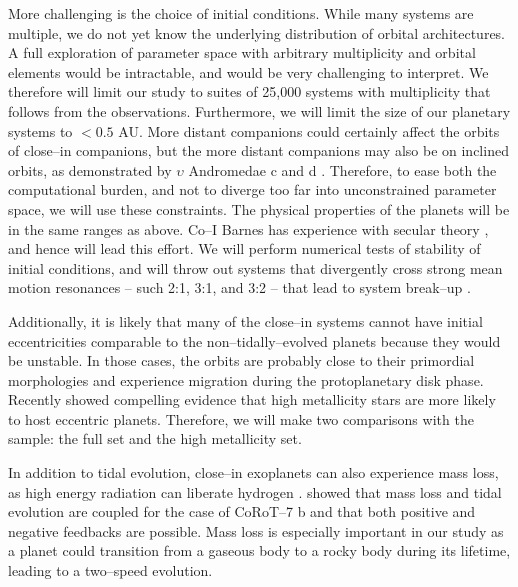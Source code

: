 More challenging is the choice of initial conditions.  While many
\kepler systems are multiple, we do not yet know the underlying
distribution of orbital architectures.  A full exploration of
parameter space with arbitrary multiplicity and orbital elements would
be intractable, and would be very challenging to interpret.  We
therefore will limit our study to suites of 25,000 systems with
multiplicity that follows from the observations.  Furthermore, we will
limit the size of our planetary systems to $<0.5$ AU.  More distant
companions could certainly affect the orbits of close--in companions,
but the more distant companions may also be on inclined orbits, as
demonstrated by $\upsilon$ Andromedae c and d
\citep{McArthur10,ReffertQuirrenbach11}.  Therefore, to ease both the
computational burden, and not to diverge too far into unconstrained
parameter space, we will use these constraints.  The physical
properties of the planets will be in the same ranges as above.  Co--I
Barnes has experience with secular theory
\citep{BarnesGreenberg06a,BarnesGreenberg06b}, and hence will lead
this effort.  We will perform numerical tests of stability of initial
conditions, and will throw out systems that divergently cross strong
mean motion resonances -- such 2:1, 3:1, and 3:2 -- that lead to
system break--up \citep[e.g.][]{Gomes05}.

Additionally, it is likely that many of the close--in systems cannot
have initial eccentricities comparable to the non--tidally--evolved
planets because they would be unstable.  In those cases, the orbits
are probably close to their primordial morphologies and experience
migration during the protoplanetary disk phase.  Recently
\cite{DawsonMurrayClay13} showed compelling evidence that high
metallicity stars are more likely to host eccentric planets.
Therefore, we will make two comparisons with the \kepler sample: the
full set and the high metallicity set.

\medskip
{\centerline{}}
\smallskip

In addition to tidal evolution, close--in exoplanets can also
experience mass loss, as high energy radiation can liberate hydrogen
\citep{Watson81,VidalMadjar03}.  \cite{Jackson10} showed that mass
loss and tidal evolution are coupled for the case of CoRoT--7 b and
that both positive and negative feedbacks are possible.  Mass loss is
especially important in our study as a planet could transition from a
gaseous body to a rocky body during its lifetime, leading to a
two--speed evolution.

